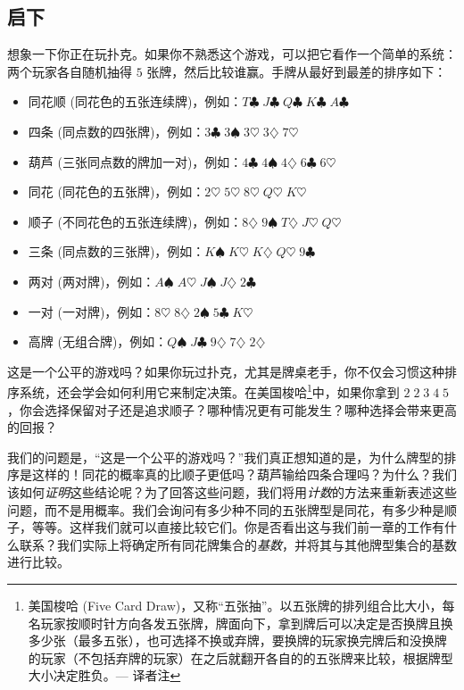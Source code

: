 
\subsection{启下}

想象一下你正在玩扑克。如果你不熟悉这个游戏，可以把它看作一个简单的系统：两个玩家各自随机抽得 $5$ 张牌，然后比较谁赢。手牌从最好到最差的排序如下：
\begin{itemize}
    \item 同花顺 (同花色的五张连续牌)，例如：$T\clubsuit\; J\clubsuit\; Q\clubsuit\; K\clubsuit\; A\clubsuit$
    \item 四条 (同点数的四张牌)，例如：$3\clubsuit\; 3\spadesuit\; 3\heartsuit\; 3\diamondsuit\; 7\heartsuit$
    \item 葫芦 (三张同点数的牌加一对)，例如：$4\clubsuit\; 4\spadesuit\; 4\diamondsuit\; 6\clubsuit\; 6\heartsuit$
    \item 同花 (同花色的五张牌)，例如：$2\heartsuit\; 5\heartsuit\; 8\heartsuit\; Q\heartsuit\; K\heartsuit$
    \item 顺子 (不同花色的五张连续牌)，例如：$8\diamondsuit\; 9\spadesuit\; T\diamondsuit\; J\heartsuit\; Q\heartsuit$
    \item 三条 (同点数的三张牌)，例如：$K\spadesuit\; K\heartsuit\; K\diamondsuit\; Q\heartsuit\; 9\clubsuit$
    \item 两对 (两对牌)，例如：$A\spadesuit\; A\heartsuit\; J\spadesuit\; J\diamondsuit\; 2\clubsuit$
    \item 一对 (一对牌)，例如：$8\heartsuit\; 8\diamondsuit\; 2\spadesuit\; 5\clubsuit\; K\heartsuit$
    \item 高牌 (无组合牌)，例如：$Q\spadesuit\; J\clubsuit\; 9\diamondsuit\; 7\diamondsuit\; 2\diamondsuit$
\end{itemize}
这是一个公平的游戏吗？如果你玩过扑克，尤其是牌桌老手，你不仅会习惯这种排序系统，还会学会如何利用它来制定决策。在美国梭哈\footnote{美国梭哈 (Five Card Draw)，又称``五张抽''。以五张牌的排列组合比大小，每名玩家按顺时针方向各发五张牌，牌面向下，拿到牌后可以决定是否换牌且换多少张（最多五张），也可选择不换或弃牌，要换牌的玩家换完牌后和没换牌的玩家（不包括弃牌的玩家）在之后就翻开各自的的五张牌来比较，根据牌型大小决定胜负。--- 译者注}中，如果你拿到 $2\; 2\; 3\; 4\; 5$，你会选择保留对子还是追求顺子？哪种情况更有可能发生？哪种选择会带来更高的回报？

我们的问题是，``这是一个公平的游戏吗？''我们真正想知道的是，为什么牌型的排序是这样的！同花的概率真的比顺子更低吗？葫芦输给四条合理吗？为什么？我们该如何\emph{证明}这些结论呢？为了回答这些问题，我们将用\emph{计数}的方法来重新表述这些问题，而不是用概率。我们会询问有多少种不同的五张牌型是同花，有多少种是顺子，等等。这样我们就可以直接比较它们。你是否看出这与我们前一章的工作有什么联系？我们实际上将确定所有同花牌集合的\emph{基数}，并将其与其他牌型集合的基数进行比较。